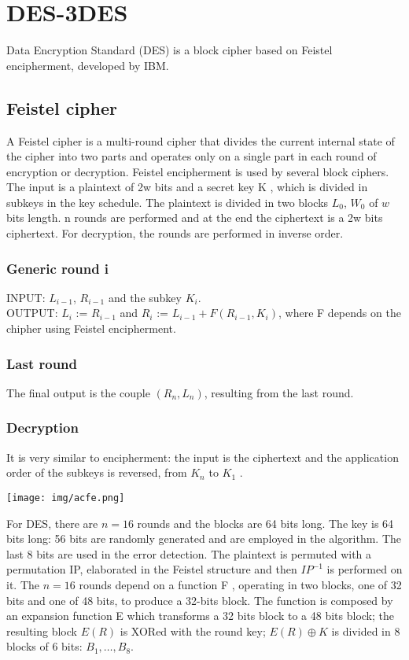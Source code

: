 \documentclass[a4paper, 10pt, titlepage]{article}
\begin{document}
\section{DES-3DES}
Data Encryption Standard (DES) is a block cipher based on Feistel encipherment, developed by IBM. 

\subsection{Feistel cipher}
A Feistel cipher is a multi-round cipher that divides the current internal state of the cipher into two parts and operates only on a single part in each round of encryption or decryption.
Feistel encipherment is used by several block ciphers.
The input is a plaintext of 2w bits and a secret key K , which is divided in subkeys in the key schedule. The plaintext is divided in two blocks $L_0$, $W_0$ of $w$ bits length.
n rounds are performed and at the end the ciphertext is a 2w bits ciphertext. For decryption, the rounds are performed in inverse order.\\
\begin{minipage}{0.55\textwidth}
\subsubsection*{Generic round i}
INPUT: $L_{i-1}$, $R_{i-1}$ and the subkey $K_i$.\\
OUTPUT: $L_i \text{ := } R_{i-1}$ and $R_i \text{ := } L_{i-1} + F(R_{i-1}, K_i)$, where F depends on the chipher using Feistel encipherment.
\subsubsection*{Last round}
The final output is the couple $(R_n, L_n )$, resulting from the last
round.
\subsubsection*{Decryption}
It is very similar to encipherment: the input is the ciphertext and the application order of the subkeys is reversed, from $K_n$ to $K_1$ .
\end{minipage}\hfill
\begin{minipage}{0.4\textwidth}
\texttt{[image: img/acfe.png]}
\end{minipage} \medskip
For DES, there are $n = 16$ rounds and the blocks are 64 bits long. The key is 64 bits long: 56 bits are randomly generated and are employed in the algorithm. The last 8 bits are used in the error detection. The plaintext is permuted with a permutation IP, elaborated in the Feistel structure and then $IP^{-1}$ is performed on it. The $n = 16$ rounds depend on a function F , operating in two blocks, one of 32 bits and one of 48 bits, to produce a 32-bits block. The function is composed by an expansion function E which transforms a 32 bits block to a 48 bits block; the resulting block $E(R)$ is XORed with the round key; $E(R) \oplus K$ is divided in 8 blocks of 6 bits: $B_1, \dots, B_8$.\\
\end{document}
